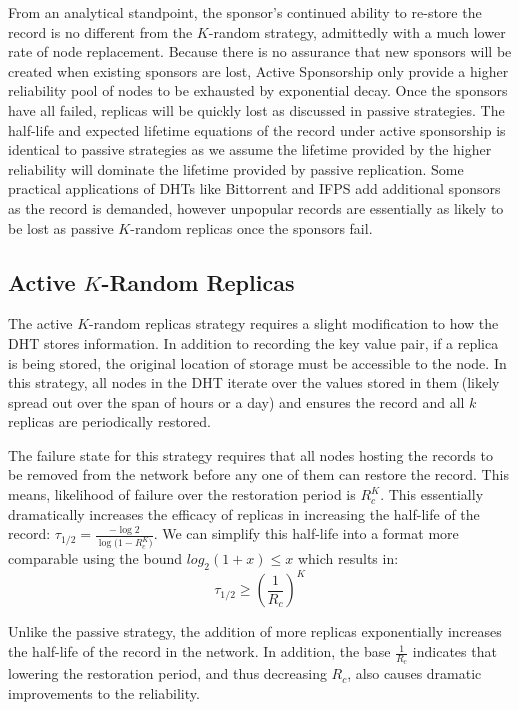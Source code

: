 From an analytical standpoint, the sponsor's continued ability to re-store the record is no different from the $K$-random strategy, admittedly with a much lower rate of node replacement.
Because there is no assurance that new sponsors will be created when existing sponsors are lost, Active Sponsorship only provide a higher reliability pool of nodes to be exhausted by exponential decay.
Once the sponsors have all failed, replicas will be quickly lost as discussed in passive strategies.
The half-life and expected lifetime equations of the record under active sponsorship is identical to passive strategies as we assume the lifetime provided by the higher reliability will dominate the lifetime provided by passive replication.
Some practical applications of DHTs like Bittorrent\cite{bittorrent} and IFPS \cite{benet2014ipfs} add additional sponsors as the record is demanded, however unpopular records are essentially as likely to be lost as passive $K$-random replicas once the sponsors fail.

\subsection{Active $K$-Random Replicas}
The active $K$-random  replicas strategy requires a slight modification to how the DHT stores information.
In addition to recording the key value pair, if a replica is being stored, the original location of storage must be accessible to the node.
In this strategy, all nodes in the DHT iterate over the values stored in them (likely spread out over the span of hours or a day) and ensures the record and all $k$ replicas are periodically restored.

The failure state for this strategy requires that all nodes hosting the records to be removed from the network before any one of them can restore the record.
This means, likelihood of failure over the restoration period is $R_{c}^{K}$. This essentially dramatically increases the efficacy of replicas in increasing the half-life of the record: $\tau_{1/2} = \frac{-\log{2} }{\log{(1-R_{c}^{K}})}$.
We can simplify this half-life into a format more comparable using the bound $log_{2}(1+x) \leq x$ which results in: 
\begin{equation}\tau_{1/2} \geq (\frac{1}{R_{c}})^{K}\end{equation}

Unlike the passive strategy, the addition of more replicas exponentially increases the half-life of the record in the network.
In addition, the base $\frac{1}{R_{c}}$ indicates that lowering the restoration period, and thus decreasing $R_{c}$, also causes dramatic improvements to the reliability.

